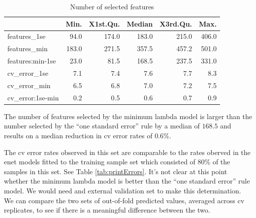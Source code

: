 \documentclass[
]{book}
\begin{document}
\begin{table}

\caption{\label{tab:model-size-enetAll}Number of selected features}
\centering
\begin{tabular}[t]{l|r|r|r|r|r}
\hline
  & Min. & X1st.Qu. & Median & X3rd.Qu. & Max.\\
\hline
features\_1se & 94.0 & 174.0 & 183.0 & 215.0 & 406.0\\
\hline
features\_min & 183.0 & 271.5 & 357.5 & 457.2 & 501.0\\
\hline
features:min-1se & 23.0 & 81.5 & 168.5 & 237.5 & 331.0\\
\hline
cv\_error\_1se & 7.1 & 7.4 & 7.6 & 7.7 & 8.3\\
\hline
cv\_error\_min & 6.5 & 6.8 & 7.0 & 7.2 & 7.5\\
\hline
cv\_error:1se-min & 0.2 & 0.5 & 0.6 & 0.7 & 0.9\\
\hline
\end{tabular}
\end{table}

The number of features selected by the minimum lambda model is larger
than the number selected by the ``one standard error'' rule by a median
of \(168.5\) and results on
a median reduction in cv error rates of
\(0.6\)\%.

The cv error rates observed in this set are comparable to the
rates oberved in the enet models fitted to the training sample set
which consisted of 80\% of the samples in this set. See Table \ref{tab:printErrors}.
It's not clear at this point whether the minimum lambda model is better than
the ``one standard error'' rule model. We would need and external validation
set to make this determination. We can compare the two sets
of out-of-fold predicted values, averaged across cv replicates, to see if
there is a meaningful difference between the two.
\end{document}
